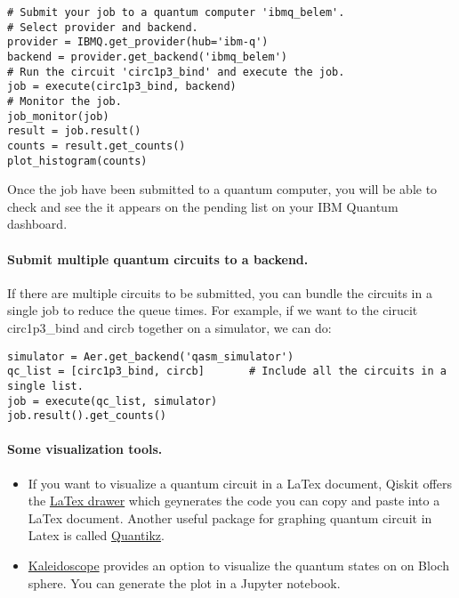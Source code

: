 \documentclass[%
oneside,                 %
final,                   %
10pt]{article}
\begin{document}
\begin{verbatim}
# Submit your job to a quantum computer 'ibmq_belem'.
# Select provider and backend.
provider = IBMQ.get_provider(hub='ibm-q') 
backend = provider.get_backend('ibmq_belem') 
# Run the circuit 'circ1p3_bind' and execute the job.
job = execute(circ1p3_bind, backend)
# Monitor the job.
job_monitor(job)
result = job.result()
counts = result.get_counts()
plot_histogram(counts)

\end{verbatim}


Once the job have been submitted to a quantum computer, you will be able to check and see the it appears on the pending list on your IBM Quantum dashboard.

\paragraph{Submit multiple quantum circuits to a backend.}
If there are multiple circuits to be submitted, you can bundle the
circuits in a single job to reduce the queue times. For example, if we
want to the cirucit circ1p3_bind and circb together on a simulator, we
can do:






\begin{verbatim}
simulator = Aer.get_backend('qasm_simulator')
qc_list = [circ1p3_bind, circb]       # Include all the circuits in a single list.
job = execute(qc_list, simulator)
job.result().get_counts()

\end{verbatim}


\paragraph{Some visualization tools.}
\begin{itemize}
\item If you want to visualize a quantum circuit in a LaTex document, Qiskit offers the \href{{https://www.youtube.com/watch?v=Q_pkenZ05eM}}{LaTex drawer} which geynerates the code you can copy and paste into a LaTex document. Another useful package for graphing quantum circuit in Latex is called \href{{http://mirrors.ibiblio.org/CTAN/graphics/pgf/contrib/quantikz/quantikz.pdf}}{Quantikz}.

\item \href{{https://nonhermitian.org/kaleido/tutorials/interactive/bloch_sphere.html}}{Kaleidoscope} provides an option to visualize the quantum states on on Bloch sphere. You can generate the plot in a Jupyter notebook.
\end{itemize}

\noindent

\end{document}
